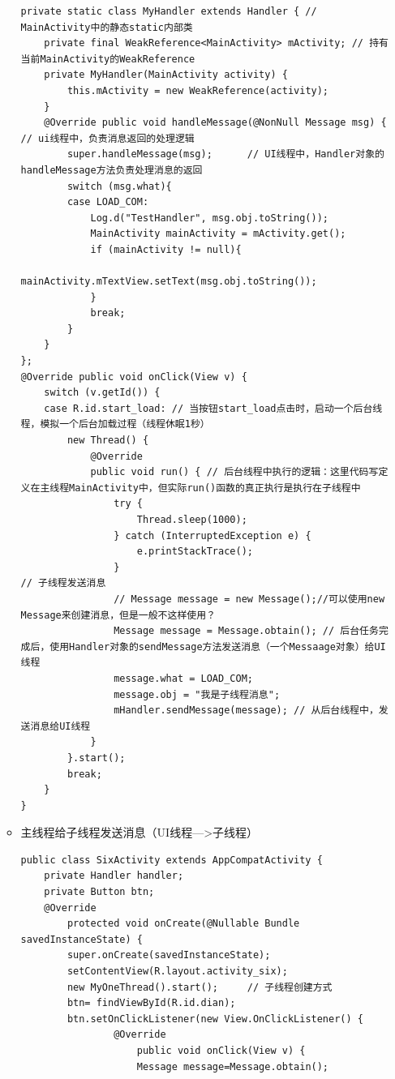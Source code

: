 \documentclass[9pt, b5paper]{article}
\begin{document}
\begin{enumerate}
\begin{itemize}
\begin{verbatim}
private static class MyHandler extends Handler { // MainActivity中的静态static内部类
    private final WeakReference<MainActivity> mActivity; // 持有当前MainActivity的WeakReference
    private MyHandler(MainActivity activity) {
        this.mActivity = new WeakReference(activity);
    }
    @Override public void handleMessage(@NonNull Message msg) { // ui线程中，负责消息返回的处理逻辑
        super.handleMessage(msg);      // UI线程中，Handler对象的handleMessage方法负责处理消息的返回
        switch (msg.what){
        case LOAD_COM:
            Log.d("TestHandler", msg.obj.toString());
            MainActivity mainActivity = mActivity.get();
            if (mainActivity != null){
                mainActivity.mTextView.setText(msg.obj.toString());
            }
            break;
        }
    }
};
@Override public void onClick(View v) {
    switch (v.getId()) {
    case R.id.start_load: // 当按钮start_load点击时，启动一个后台线程，模拟一个后台加载过程（线程休眠1秒）
        new Thread() {
            @Override
            public void run() { // 后台线程中执行的逻辑：这里代码写定义在主线程MainActivity中，但实际run()函数的真正执行是执行在子线程中
                try {
                    Thread.sleep(1000);
                } catch (InterruptedException e) {
                    e.printStackTrace();
                }
// 子线程发送消息
                // Message message = new Message();//可以使用new Message来创建消息，但是一般不这样使用？
                Message message = Message.obtain(); // 后台任务完成后，使用Handler对象的sendMessage方法发送消息（一个Messaage对象）给UI线程
                message.what = LOAD_COM;
                message.obj = "我是子线程消息";
                mHandler.sendMessage(message); // 从后台线程中，发送消息给UI线程
            }
        }.start();
        break;
    }
}
\end{verbatim}
\item 主线程给子线程发送消息（UI线程--->子线程）
\begin{verbatim}
public class SixActivity extends AppCompatActivity {
    private Handler handler;
    private Button btn;
    @Override
        protected void onCreate(@Nullable Bundle savedInstanceState) {
        super.onCreate(savedInstanceState);
        setContentView(R.layout.activity_six);
        new MyOneThread().start();     // 子线程创建方式
        btn= findViewById(R.id.dian);
        btn.setOnClickListener(new View.OnClickListener() {
                @Override
                    public void onClick(View v) {
                    Message message=Message.obtain();

\end{verbatim}
\end{itemize}
\end{enumerate}
\end{document}
